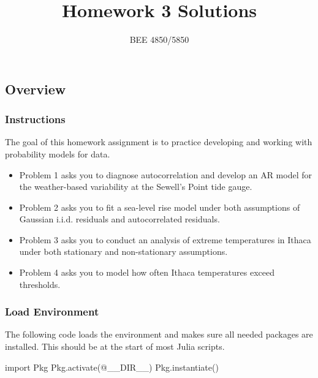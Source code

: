 \documentclass[
  letterpaper,
  DIV=11,
  numbers=noendperiod]{scrartcl}
\title{Homework 3 Solutions}
\subtitle{BEE 4850/5850}
\author{}
\date{}
\newenvironment{Shaded}{\begin{snugshade}}{\end{snugshade}}
\newcommand{\BuiltInTok}[1]{\textcolor[rgb]{0.00,0.23,0.31}{#1}}
\newcommand{\FunctionTok}[1]{\textcolor[rgb]{0.28,0.35,0.67}{#1}}
\newcommand{\ImportTok}[1]{\textcolor[rgb]{0.00,0.46,0.62}{#1}}
\newcommand{\NormalTok}[1]{\textcolor[rgb]{0.00,0.23,0.31}{#1}}
\newcommand{\PreprocessorTok}[1]{\textcolor[rgb]{0.68,0.00,0.00}{#1}}
\providecommand{\tightlist}{%
  \setlength{\itemsep}{0pt}\setlength{\parskip}{0pt}}
\begin{document}
\maketitle



\subsection{Overview}\label{overview}

\subsubsection{Instructions}\label{instructions}

The goal of this homework assignment is to practice developing and
working with probability models for data.

\begin{itemize}
\tightlist
\item
  Problem 1 asks you to diagnose autocorrelation and develop an AR model
  for the weather-based variability at the Sewell's Point tide gauge.
\item
  Problem 2 asks you to fit a sea-level rise model under both
  assumptions of Gaussian i.i.d. residuals and autocorrelated residuals.
\item
  Problem 3 asks you to conduct an analysis of extreme temperatures in
  Ithaca under both stationary and non-stationary assumptions.
\item
  Problem 4 asks you to model how often Ithaca temperatures exceed
  thresholds.
\end{itemize}

\subsubsection{Load Environment}\label{load-environment}

The following code loads the environment and makes sure all needed
packages are installed. This should be at the start of most Julia
scripts.

\begin{Shaded}
\begin{Highlighting}[]
\ImportTok{import} \BuiltInTok{Pkg}
\BuiltInTok{Pkg}\NormalTok{.}\FunctionTok{activate}\NormalTok{(}\PreprocessorTok{@\_\_DIR\_\_}\NormalTok{)}
\BuiltInTok{Pkg}\NormalTok{.}\FunctionTok{instantiate}\NormalTok{()}
\end{Highlighting}
\end{Shaded}
\end{document}
